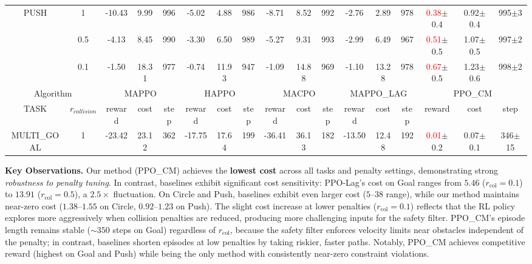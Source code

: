 \documentclass[letterpaper, 10 pt, conference]{ieeeconf}
\begin{document}
\begin{table}[h!]
\begin{center}
{\begin{tabular}{cc|*{4}{ccc|}ccc}
      \multirow{3}{*}{PUSH}
      & 1
          & -10.43 & 9.99 & 996
          & -5.02 & 4.88 & 986
          & -8.71 & 8.52 & 992
          & -2.76 & 2.89 & 978
          &  \textcolor{red}{0.38}{\tiny$\pm$0.4} & \textcolor{Green3}{0.92}{\tiny$\pm$0.4} & 995{\tiny$\pm$3} \\
      & 0.5
          & -4.13 & 8.45 & 990
          & -3.30 & 6.50 & 989
          & -5.27 & 9.31 & 993
          & -2.99 & 6.49 & 967
          & \textcolor{red}{0.51}{\tiny$\pm$0.5} & \textcolor{Green3}{1.07}{\tiny$\pm$0.5} & 997{\tiny$\pm$2} \\
      & 0.1
          & -1.50 & 18.31 & 977
          & -0.74 & 11.93 & 947
          & -1.09 & 14.88 & 969
          & -1.10 & 13.28 & 978
          & \textcolor{red}{0.67}{\tiny$\pm$0.5} & \textcolor{Green3}{1.23}{\tiny$\pm$0.6} & 998{\tiny$\pm$2} \\ \hline

      \multicolumn{2}{c|}{Algorithm} &
      \multicolumn{3}{c|}{MAPPO} &
      \multicolumn{3}{c|}{HAPPO} &
      \multicolumn{3}{c|}{MACPO} &
      \multicolumn{3}{c|}{MAPPO\_LAG} &
      \multicolumn{3}{c}{PPO\_CM}\\
      TASK & $r_{collision}$
          & reward & cost & step
          & reward & cost & step
          & reward & cost & step
          & reward & cost & step
          & reward & cost & step \\ \hline

      MULTI\_GOAL
      & 1
          & -23.42 & 23.12 & 362
          & -17.75 & 17.64 & 199
          & -36.41 & 36.13 & 182
          & -13.50 & 12.48 & 192
          & \textcolor{red}{0.01}{\tiny$\pm$0.2} & \textcolor{Green3}{0.07}{\tiny$\pm$0.1} & 346{\tiny$\pm$15}
  \\ \hline

      \end{tabular}
      }
    \end{center}
  \end{table}

\textbf{Key Observations.}
Our method (PPO\_CM) achieves the \textbf{lowest cost} across all tasks and penalty settings, demonstrating strong \emph{robustness to penalty tuning}. In contrast, baselines exhibit significant cost sensitivity: PPO-Lag's cost on Goal ranges from $5.46$ ($r_{\text{col}}=0.1$) to $13.91$ ($r_{\text{col}}=0.5$), a $2.5\times$ fluctuation. On Circle and Push, baselines exhibit even larger cost ($5$--$38$ range), while our method maintains near-zero cost ($1.38$--$1.55$ on Circle, $0.92$--$1.23$ on Push). The slight cost increase at lower penalties ($r_{\text{col}}{=}0.1$) reflects that the RL policy explores more aggressively when collision penalties are reduced, producing more challenging inputs for the safety filter. PPO\_CM's episode length remains stable (${\sim}350$ steps on Goal) regardless of $r_{\text{col}}$, because the safety filter enforces velocity limits near obstacles independent of the penalty; in contrast, baselines shorten episodes at low penalties by taking riskier, faster paths. Notably, PPO\_CM achieves competitive reward (highest on Goal and Push) while being the only method with consistently near-zero constraint violations.
\end{document}
